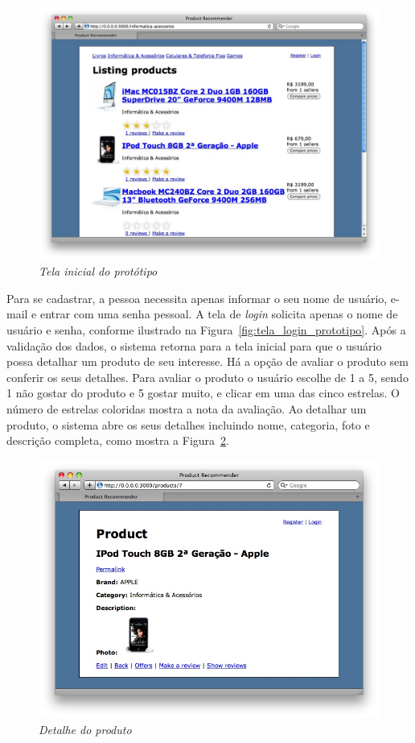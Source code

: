 \begin{figure}
  \centering
  \includegraphics[width=\textwidth]{imagens/Tela_Inicial_Prototipo}
  \caption{\it Tela inicial do protótipo}
  \label{fig:tela_inicial_prototipo}
\end{figure}

 Para se cadastrar, a pessoa necessita apenas informar o seu nome de usuário, e-mail e entrar com uma senha pessoal. A tela de \textit{login} solicita apenas o nome de usuário e senha, conforme ilustrado na Figura~\ref{fig:tela_login_prototipo}. Após a validação dos dados, o sistema retorna para a tela inicial para que o usuário possa detalhar um produto de seu interesse. Há a opção de avaliar o produto sem conferir os seus detalhes. Para avaliar o produto o usuário escolhe de 1 a 5, sendo 1 não gostar do produto e 5 gostar muito, e clicar em uma das cinco estrelas. O número de estrelas coloridas mostra a nota da avaliação. Ao detalhar um produto, o sistema abre os seus detalhes incluindo nome, categoria, foto e descrição completa, como mostra a Figura~\ref{fig:detalhe_produto_prototipo}.

\begin{figure}
  \centering
  \includegraphics[width=\textwidth]{imagens/Detalhe_Produto_Prototipo}
  \caption{\it Detalhe do produto}
  \label{fig:detalhe_produto_prototipo}
\end{figure}

